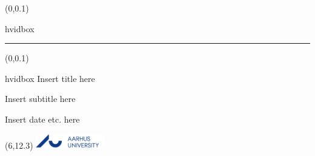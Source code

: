 \documentclass[t,24pt,aspectratio=169]{beamer}
\begin{document}
{
\begin{frame}
    \begin{textblock*}{\textwidth}(0\textwidth,0.1\textheight)
        \begin{beamercolorbox}[wd=9cm,ht=7.3cm,sep=0.5cm]{hvidbox}
            \fontsize{5}{10}\selectfont
            \noindent\textcolor{AUblaa}{\rule{8.3cm}{0.4pt}}
        \end{beamercolorbox}
    \end{textblock*}
    \begin{textblock*}{\textwidth}(0\textwidth,0.1\textheight)
        \begin{beamercolorbox}[wd=9cm,sep=0.5cm]{hvidbox}
                \Huge \textcolor{AUblaa}{Insert title here
                }
                \vspace{0.5cm}
                \par
                \Large
                Insert subtitle here
                \vspace{0.5cm}
                \par
                \normalsize
                Insert date etc. here
        \end{beamercolorbox}
    \end{textblock*}
    \begin{textblock}{1}(6,12.3)
        \includegraphics[width=3cm]{AU/AU-logo.png}
    \end{textblock}
\end{frame}
}
\end{document}
